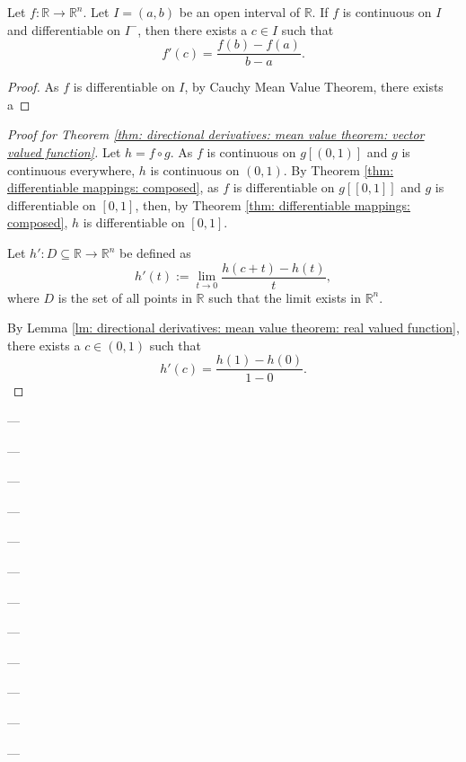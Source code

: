 \begin{lemma}
	\label{lm: directional derivatives: mean value theorem: real valued function}
	
	Let $f: \mathbb R \to \mathbb R^n$. Let $I = (a,b)$ be an open interval of $\mathbb R$. If $f$ is continuous on $I$ and differentiable on $I^-$, then there exists a $c \in I$ such that
	$$
	f'(c) = \frac{f(b) - f(a)}{b - a}.
	$$
	
	\begin{proof}
		As $f$ is differentiable on $I$, by Cauchy Mean Value Theorem, there exists a
	\end{proof}
\end{lemma}



\begin{proof}[Proof for Theorem \ref{thm: directional derivatives: mean value theorem: vector valued function}]
	Let $h = f \circ g$. As $f$ is continuous on $g[(0,1)]$ and $g$ is continuous everywhere, $h$ is continuous on $(0,1)$. By Theorem \ref{thm: differentiable mappings: composed}, as $f$ is differentiable on $g[[0,1]]$ and $g$ is differentiable on $[0,1]$, then, by Theorem \ref{thm: differentiable mappings: composed}, $h$ is differentiable on $[0,1]$.
	
	Let $h': D \subseteq \mathbb R \to \mathbb R^n$ be defined as
	$$
	h'(t) := \lim_{t \to 0} \frac{h(c + t) - h(t)}{t},
	$$
	where $D$ is the set of all points in $\mathbb R$ such that the limit exists in $\mathbb R^n$.
	
	By Lemma \ref{lm: directional derivatives: mean value theorem: real valued function}, there exists a $c \in (0,1)$ such that
	$$
	h'(c) = \frac{h(1) - h(0)}{1 - 0}.
	$$
	
	
\end{proof}



---

---

---

---

---

---

---

---

---

---

---

---














































%